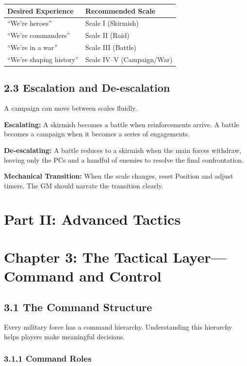 \documentclass[11pt]{article}
\begin{document}
\begin{tabular}{|l|l|}
\hline
Desired Experience & Recommended Scale \\
\hline
``We're heroes'' & Scale I (Skirmish) \\
\hline
``We're commanders'' & Scale II (Raid) \\
\hline
``We're in a war'' & Scale III (Battle) \\
\hline
``We're shaping history'' & Scale IV–V (Campaign/War) \\
\hline
\end{tabular}

\subsection{2.3 Escalation and De-escalation}

A campaign can move between scales fluidly.

\textbf{Escalating:} A skirmish becomes a battle when reinforcements arrive. A battle becomes a campaign when it becomes a series of engagements.

\textbf{De-escalating:} A battle reduces to a skirmish when the main forces withdraw, leaving only the PCs and a handful of enemies to resolve the final confrontation.

\textbf{Mechanical Transition:} When the scale changes, reset Position and adjust timers. The GM should narrate the transition clearly.

\section{Part II: Advanced Tactics}

\section{Chapter 3: The Tactical Layer—Command and Control}

\subsection{3.1 The Command Structure}

Every military force has a command hierarchy. Understanding this hierarchy helps players make meaningful decisions.

\subsubsection{3.1.1 Command Roles}
\end{document}

